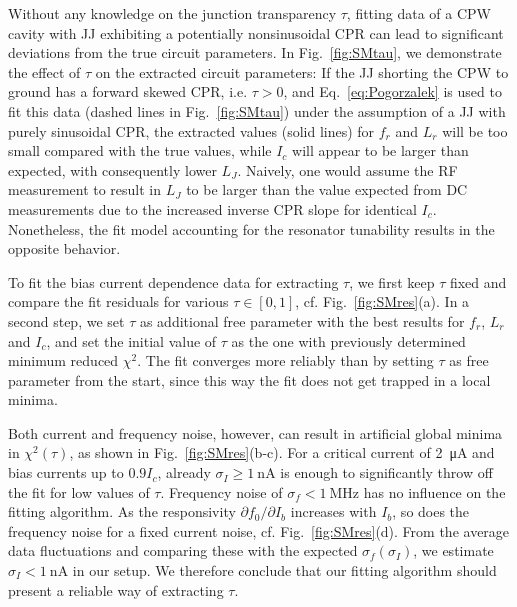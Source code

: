 Without any knowledge on the junction transparency $\tau$, fitting data of a CPW cavity with JJ exhibiting a potentially nonsinusoidal CPR can lead to significant deviations from the true circuit parameters.
%
In Fig.~\ref{fig:SMtau}, we demonstrate the effect of $\tau$ on the extracted circuit parameters:
%
If the JJ shorting the CPW to ground has a forward skewed CPR, i.e. $\tau>0$, and Eq.~\ref{eq:Pogorzalek} is used to fit this data (dashed lines in Fig.~\ref{fig:SMtau}) under the assumption of a JJ with purely sinusoidal CPR, the extracted values (solid lines) for $f_r$ and $L_r$ will be too small compared with the true values, while $I_c$ will appear to be larger than expected, with consequently lower $L_J$.
%
Naively, one would assume the RF measurement to result in $L_J$ to be larger than the value expected from DC measurements due to the increased inverse CPR slope for identical $I_c$.
%
Nonetheless, the fit model accounting for the resonator tunability results in the opposite behavior.

To fit the bias current dependence data for extracting $\tau$, we first keep $\tau$ fixed and compare the fit residuals for various $\tau\in[0,1]$, cf. Fig.~\ref{fig:SMres}(a).
%
In a second step, we set $\tau$ as additional free parameter with the best results for $f_r$, $L_r$ and $I_c$, and set the initial value of $\tau$ as the one with previously determined minimum reduced $\chi^2$.
%
The fit converges more reliably than by setting $\tau$ as free parameter from the start, since this way the fit does not get trapped in a local minima.

Both current and frequency noise, however, can result in artificial global minima in $\chi^2(\tau)$, as shown in Fig.~\ref{fig:SMres}(b-c).
%
For a critical current of \SI{2}{\micro\ampere} and bias currents up to $0.9I_c$, already $\sigma_I\geq\SI{1}{\nano\ampere}$ is enough to significantly throw off the fit for low values of $\tau$.
%
Frequency noise of $\sigma_f<\SI{1}{\mega\hertz}$ has no influence on the fitting algorithm.
%
As the responsivity $\partial f_0/\partial I_b$ increases with $I_b$, so does the frequency noise for a fixed current noise, cf. Fig.~\ref{fig:SMres}(d).
%
From the average data fluctuations and comparing these with the expected $\sigma_f(\sigma_I)$, we estimate $\sigma_I<\SI{1}{\nano\ampere}$ in our setup.
%
We therefore conclude that our fitting algorithm should present a reliable way of extracting $\tau$. 

